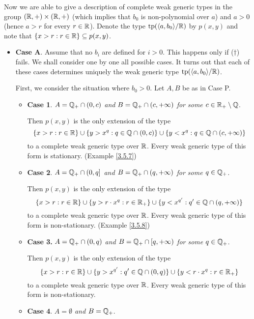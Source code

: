 \documentclass[11pt]{article}
\begin{document}
Now we are able to give a description of complete weak generic types in the
group \((\mathbb{R},+)\times(\mathbb{R},+)\) (which implies that \(b_0\) is non-polynomial over \(a\)) and \(a>0\)
(hence \(a>r\) for every \(r\in\mathbb{R}\)). Denote the type \(\operatorname{tp}(\langle a,b_0\rangle/\mathbb{R})\) by \(p(x,y)\) and note
that \(\{x>r:r\in\mathbb{R}\}\subseteq p(x,y)\).

\begin{itemize}
\item \textbf{Case A}. Assume that no \(b_i\) are defined for \(i>0\). This happens only if (\(\dagger\)) fails. We
shall consider one by one all possible cases. It turns out that each of these cases determines
uniquely the weak generic type \(\operatorname{tp}(\langle a,b_0\rangle/\mathbb{R})\).

First, we consider the situation where \(b_0>0\). Let \(A,B\) be as in Case P.
\begin{itemize}
\item \textbf{Case 1}. \emph{\(A=\mathbb{Q}_+\cap(0,c)\) and \(B=\mathbb{Q}_+\cap(c,+\infty)\) for some \(c\in\mathbb{R}_+\setminus\mathbb{Q}\)}.

Then \(p(x,y)\) is the only extension of the type
\begin{equation*}
\{x>r:r\in\mathbb{R}\}\cup\{y>x^q:q\in\mathbb{Q}\cap(0,c)\}\cup\{y<x^q:q\in\mathbb{Q}\cap(c,+\infty)\}
\end{equation*}
to a complete weak generic type over \(\mathbb{R}\). Every weak generic type of this form is
stationary. (Example \ref{3.5.7})
\item \textbf{Case 2}. \emph{\(A=\mathbb{Q}_+\cap(0,q]\) and \(B=\mathbb{Q}_+\cap(q,+\infty)\) for some \(q\in\mathbb{Q}_+\).}

Then \(p(x,y)\) is the only extension of the type
\begin{equation*}
\{x>r:r\in\mathbb{R}\}\cup\{y>r\cdot x^q:r\in\mathbb{R}_+\}\cup\{y<x^{q'}:q'\in\mathbb{Q}\cap(q,+\infty)\}
\end{equation*}
to a complete weak generic type over \(\mathbb{R}\). Every weak generic type of this form is
non-stationary. (Example \ref{3.5.8})
\item \textbf{Case 3.} \emph{\(A=\mathbb{Q}_+\cap(0,q)\) and \(B=\mathbb{Q}_+\cap[q,+\infty)\) for some \(q\in\mathbb{Q}_+\)}.

Then \(p(x,y)\) is the only extension of the type
\begin{equation*}
\{x>r:r\in\mathbb{R}\}\cup\{y>x^{q'}:q'\in\mathbb{Q}\cap(0,q)\}\cup\{y<r\cdot x^q:r\in\mathbb{R}_+\}
\end{equation*}
to a complete weak generic type over \(\mathbb{R}\). Every weak generic type of this form is
non-stationary.
\item \textbf{Case 4}. \emph{\(A=\emptyset\) and \(B=\mathbb{Q}_+\)}.


\end{itemize}
\end{itemize}
\end{document}
